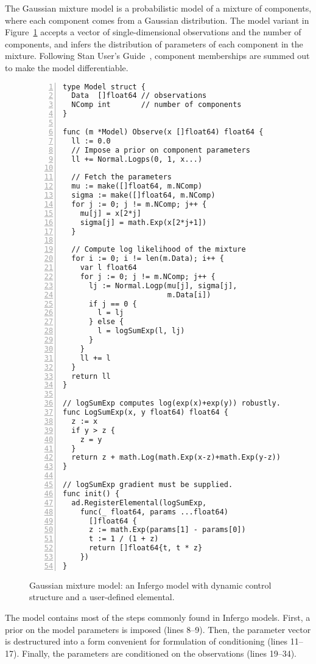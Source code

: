 \documentclass[sigplan,review,10pt,anonymous]{acmart}
\begin{document}
\begin{sloppypar}
The Gaussian mixture model is a probabilistic model of a mixture
of components, where each component comes from a Gaussian
distribution. The model variant in
Figure~\ref{fig:gaussian-mixture} accepts a vector of
single-dimensional observations and the number of components,
and infers the distribution of parameters of each component
in the mixture. Following Stan User's Guide~\cite{SDT18},
component memberships are summed out to make the model
differentiable.
\begin{figure}
\begin{lstlisting}[framexleftmargin=10pt,numbers=left]
type Model struct {
  Data  []float64 // observations
  NComp int       // number of components
}

func (m *Model) Observe(x []float64) float64 {
  ll := 0.0
  // Impose a prior on component parameters
  ll += Normal.Logps(0, 1, x...)

  // Fetch the parameters
  mu := make([]float64, m.NComp)
  sigma := make([]float64, m.NComp)
  for j := 0; j != m.NComp; j++ {
    mu[j] = x[2*j]
    sigma[j] = math.Exp(x[2*j+1])
  }

  // Compute log likelihood of the mixture
  for i := 0; i != len(m.Data); i++ {
    var l float64
    for j := 0; j != m.NComp; j++ {
      lj := Normal.Logp(mu[j], sigma[j],
                        m.Data[i])
      if j == 0 {
        l = lj
      } else {
        l = logSumExp(l, lj)
      }
    }
    ll += l
  }
  return ll
}

// logSumExp computes log(exp(x)+exp(y)) robustly.
func LogSumExp(x, y float64) float64 {
  z := x
  if y > z {
    z = y
  }
  return z + math.Log(math.Exp(x-z)+math.Exp(y-z))
}

// logSumExp gradient must be supplied.
func init() {
  ad.RegisterElemental(logSumExp,
    func(_ float64, params ...float64)
      []float64 {
      z := math.Exp(params[1] - params[0])
      t := 1 / (1 + z)
      return []float64{t, t * z}
    })
}
\end{lstlisting}
\caption{Gaussian mixture model: an Infergo model with
  dynamic control structure and a user-defined elemental.}
\label{fig:gaussian-mixture}
\end{figure}
The model contains most of the steps commonly found in Infergo
models. First, a prior on the model parameters is imposed (lines
8--9). Then, the parameter vector is destructured into a form
convenient for formulation of conditioning (lines 11--17).
Finally, the parameters are conditioned on the observations
(lines 19--34). 


\end{sloppypar}
\end{document}
